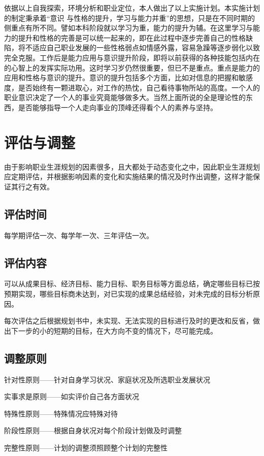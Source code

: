 \documentclass{article}
\begin{document}
 依据以上自我探索，环境分析和职业定位，本人做出了以上实施计划。本实施计划的制定秉承着“意识 与性格的提升，学习与能力并重”的思想，只是在不同时期的侧重点有所不同。譬如本科阶段就以学习为重，能力的提升为辅。在这里学习与能力的提升和性格的完善是可以统一起来的，即在此过程中逐步完善自己的性格缺陷，将不适应自己职业发展的一些性格弱点如情感外露，容易急躁等逐步弱化以致完全克服。工作后是能力应用与意识提升阶段，即将以前获得的各种技能包括内在的心智上的发挥实际功用。这时学习岁仍然很重要，但已不是重点。重点是能力的应用和性格与意识的提升。意识的提升包括多个方面，比如对信息的把握和敏感度，是否始终有一颗进取心，对工作的热忱，自己看待事物所站的高度。一个人的职业意识决定了一个人的事业究竟能够做多大。当然上面所说的全是理论性的东西，是否能够指导一个人走向事业的顶峰还得看个人的素养与坚持。
\par 
\section{评估与调整}
由于影响职业生涯规划的因素很多，且大都处于动态变化之中，因此职业生涯规划应定期评估，并根据影响因素的变化和实施结果的情况及时作出调整，这样才能保证其行之有效。\par 
\subsection{评估时间}
每学期评估一次、每学年一次、三年评估一次。\par
\subsection{评估内容}
可以从成果目标、经济目标、能力目标、职务目标等方面总结，确定哪些目标已按预期实现，哪些目标商未达到，对已实现的成果总结经验，对未完成的目标分析原因。\par
每次评估之后根据规划书中，未实现、无法实现的目标进行及时的更改和反省，做出下一步的小的短期的目标，在大方向不变的情况下，尽可能完成。\par
\subsection{调整原则}
针对性原则——针对自身学习状况、家庭状况及所选职业发展状况\par
实事求是原则——如实评价自己各方面状况\par
特殊性原则——特殊情况应特殊对待\par
阶段性原则——根据自身状况对每个阶段计划做及时调整\par
完整性原则——计划的调整须照顾整个计划的完整性\par
\end{document}
